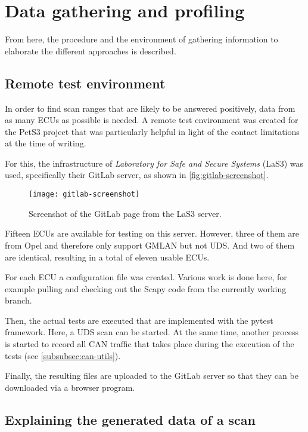 \chapter{Data gathering and profiling}
\label{sec:data-gathering}

From here, the procedure and the environment of gathering information to elaborate the different approaches is described.

\section{Remote test environment}

In order to find scan ranges that are likely to be answered positively, data from as many ECUs as possible is needed. A remote test environment was created for the PetS3 project that was particularly helpful in light of the contact limitations at the time of writing.

For this, the infrastructure of \emph{Laboratory for Safe and Secure Systems} (LaS3) was used, specifically their GitLab server, as shown in \autoref{fig:gitlab-screenshot}.

\begin{figure}[htb]
    \centering
    \texttt{[image: gitlab-screenshot]}
    \caption{Screenshot of the GitLab page from the LaS3 server.}
    \label{fig:gitlab-screenshot}
\end{figure}

Fifteen ECUs are available for testing on this server. However, three of them are from Opel and therefore only support GMLAN but not UDS. And two of them are identical, resulting in a total of eleven usable ECUs.

For each ECU a configuration file was created. Various work is done here, for example pulling and checking out the Scapy code from the currently working branch.

Then, the actual tests are executed that are implemented with the pytest framework. Here, a UDS scan can be started. At the same time, another process is started to record all CAN traffic that takes place during the execution of the tests (see \autoref{subsubsec:can-utils}).

Finally, the resulting files are uploaded to the GitLab server so that they can be downloaded via a browser program.

\section{Explaining the generated data of a scan}

